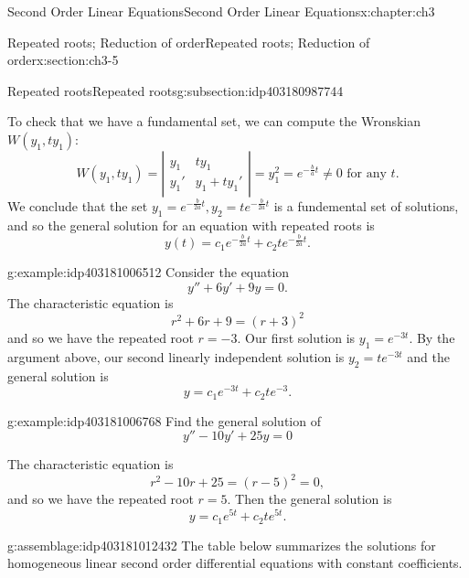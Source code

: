 \documentclass[oneside,10pt,]{book}
\numberwithin{equation}{section}
\numberwithin{equation}{section}
\newcommand{\amp}{&}
\begin{document}
\begin{chapterptx}{Second Order Linear Equations}{}{Second Order Linear Equations}{}{}{x:chapter:ch3}
\begin{sectionptx}{Repeated roots; Reduction of order}{}{Repeated roots; Reduction of order}{}{}{x:section:ch3-5}
\begin{subsectionptx}{Repeated roots}{}{Repeated roots}{}{}{g:subsection:idp403180987744}
\par
To check that we have a fundamental set, we can compute the Wronskian \(W(y_1, t y_1)\):%
\begin{equation*}
W(y_1, t y_1) = \left| \begin{array}{cc} y_1 \amp t y_1 \\
y_1' \amp y_1 + t y_1' \end{array}\right| = y_1^2 = e^{-\frac{b}{a}t} \neq 0 \text{ for any } t.
\end{equation*}
We conclude that the set \(y_1 = e^{-\frac{b}{2a}t}, y_2 = t e^{-\frac{b}{2a}t}\) is a fundemental set of solutions, and so the general solution for an equation with repeated roots is%
\begin{equation*}
y(t) = c_1 e^{-\frac{b}{2a}t} + c_2t e^{-\frac{b}{2a}t}.
\end{equation*}
%
\begin{example}{}{g:example:idp403181006512}%
Consider the equation%
\begin{equation*}
y'' + 6y' + 9y = 0.
\end{equation*}
The characteristic equation is%
\begin{equation*}
r^2 + 6r + 9 = (r + 3)^2
\end{equation*}
and so we have the repeated root \(r = -3\). Our first solution is \(y_1 = e^{-3t}\). By the argument above, our second linearly independent solution is \(y_2 = t e^{-3t}\) and the general solution is%
\begin{equation*}
y = c_1 e^{-3t} + c_2 t e^{-3}.
\end{equation*}
%
\end{example}
\begin{example}{}{g:example:idp403181006768}%
Find the general solution of%
\begin{equation*}
y'' - 10 y' + 25 y = 0
\end{equation*}
%
\par
The characteristic equation is%
\begin{equation*}
r^2 - 10 r + 25 = (r - 5)^2 = 0,
\end{equation*}
and so we have the repeated root \(r = 5\). Then the general solution is%
\begin{equation*}
y = c_1 e^{5t} + c_2 te^{5t}.
\end{equation*}
%
\end{example}
\begin{assemblage}{}{g:assemblage:idp403181012432}%
The table below summarizes the solutions for homogeneous linear second order differential equations with constant coefficients.%

\end{assemblage}
\end{subsectionptx}
\end{sectionptx}
\end{chapterptx}
\end{document}
